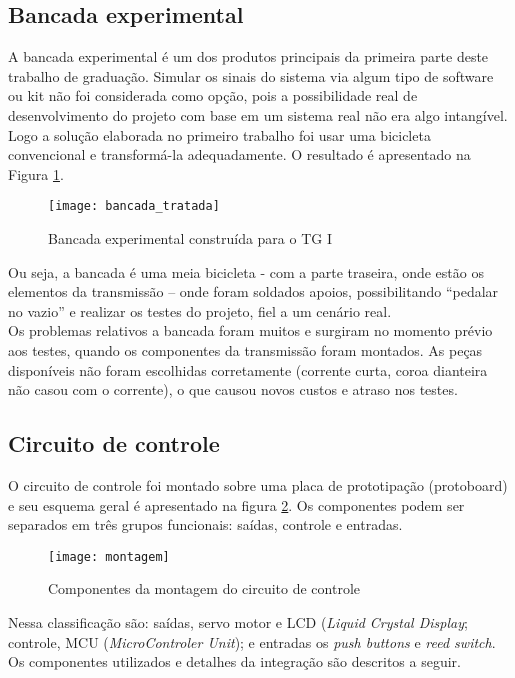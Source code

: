 \documentclass[a4paper,11pt]{article}
\begin{document}
\subsection{Bancada experimental}
\label{sec:bancada}
A bancada experimental é um dos produtos principais da primeira parte deste
trabalho de graduação. Simular os sinais do sistema via algum tipo de software
ou kit não foi considerada como opção, pois a possibilidade real de
desenvolvimento do projeto com base em um sistema real não era algo intangível.
Logo a solução elaborada no primeiro trabalho foi usar uma bicicleta
convencional e transformá-la adequadamente. O resultado é apresentado na Figura
\ref{fig:bancada}.
\begin{figure}[ht]
 \begin{center}
  \texttt{[image: bancada\_tratada]}
 \end{center}
 \caption{Bancada experimental construída para o TG I}
 \label{fig:bancada}
\end{figure}
Ou seja, a bancada é uma meia bicicleta - com a parte traseira, onde estão os
elementos da transmissão  -- onde foram soldados apoios, possibilitando
``pedalar no vazio'' e realizar os testes do projeto, fiel a um cenário real. \\
Os problemas relativos a bancada foram muitos e surgiram no momento prévio aos
testes, quando os componentes da transmissão foram montados. As peças
disponíveis não foram escolhidas corretamente (corrente curta, coroa dianteira
não casou com o corrente), o que causou novos custos e atraso nos testes.

%
\subsection{Circuito de controle}
\label{sec:montagem}
O circuito de controle foi montado sobre uma placa de prototipação (protoboard)
e seu esquema geral é apresentado na figura \ref{fig:montagem}.
Os componentes podem ser separados em três grupos funcionais: saídas, controle
e entradas.
\begin{figure}[ht]
\begin{center}
 \texttt{[image: montagem]}
\end{center}
  \caption{Componentes da montagem do circuito de controle}
  \label{fig:montagem}
\end{figure}
Nessa classificação são: saídas, servo motor e LCD (\textit{Liquid
Crystal Display}; controle, MCU (\textit{MicroControler Unit}); e entradas os
\textit{push buttons} e \textit{reed switch}. Os componentes utilizados e
detalhes da integração são descritos a seguir.
\end{document}
